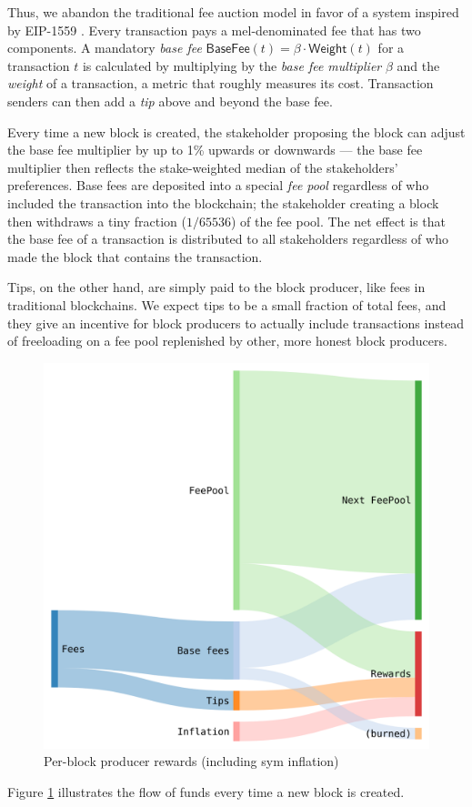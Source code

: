 \documentclass[letterpaper,12pt,oneside]{article}
\begin{document}
Thus, we abandon the traditional fee auction model in favor of a system inspired by EIP-1559 \cite{eip1559}. Every transaction pays a mel-denominated fee that has two components. A mandatory \textit{base fee} $\mathsf{BaseFee}(t) = \beta \cdot \mathsf{Weight}(t)$ for a transaction $t$ is calculated by multiplying by the \textit{base fee multiplier} $\beta$ and the \textit{weight} of a transaction, a metric that roughly measures its cost. Transaction senders can then add a \textit{tip} above and beyond the base fee.

Every time a new block is created, the stakeholder proposing the block can adjust the base fee multiplier by up to 1\% upwards or downwards --- the base fee multiplier then reflects the stake-weighted median of the stakeholders' preferences. Base fees are deposited into a special \textit{fee pool} regardless of who included the transaction into the blockchain; the stakeholder creating a block then withdraws a tiny fraction ($1/65536$) of the fee pool. The net effect is that the base fee of a transaction is distributed to all stakeholders regardless of who made the block that contains the transaction.

Tips, on the other hand, are simply paid to the block producer, like fees in traditional blockchains. We expect tips to be a small fraction of total fees, and they give an incentive for block producers to actually include transactions instead of freeloading on a fee pool replenished by other, more honest block producers.

\begin{figure}
    \centering \includegraphics[width=0.5\linewidth]{fees.png}
    \caption{Per-block producer rewards (including sym inflation)}
    \label{fig:fees}
\end{figure}

Figure \ref{fig:fees} illustrates the flow of funds every time a new block is created.
\end{document}

